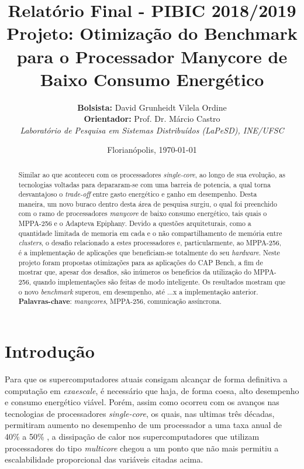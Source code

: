 \documentclass[a4paper,11pt]{article}
\title{\hspace{-0.6cm}\textbf{Relatório Final - PIBIC 2018/2019}\\[0.2cm] \hspace{-0.6cm}\textbf{Projeto:} Otimização do Benchmark \capb para o Processador Manycore de Baixo Consumo Energético \mppa}
\author{\hspace{-0.6cm}\textbf{Bolsista:} David Grunheidt Vilela Ordine\\\hspace{-0.6cm}\textbf{Orientador:} Prof. Dr. Márcio Castro\\ \hspace{-0.6cm}\small{\emph{Laboratório de Pesquisa em Sistemas Distribuídos (LaPeSD), INE/UFSC}}}
\date{\hspace{-0.6cm}\small{Florianópolis, \today}}
\newcommand{\mppa}{MPPA-256\xspace}
\newcommand{\capb}{CAP Bench\xspace}
\newcommand{\epiphany}{Adapteva Epiphany\xspace}
\newcommand{\manycore}{\textit{manycore}\xspace}
\begin{document}
%

\maketitle

\begin{abstract}
Similar ao que aconteceu com os processadores \textit{single-core}, ao longo de sua evolução, as tecnologias voltadas para \hpc depararam-se com uma barreia de potencia, a qual torna desvantajoso o \textit{trade-off} entre gasto energético e ganho em desempenho. Desta maneira, um novo buraco dentro desta área de pesquisa surgiu, o qual foi preenchido com o ramo de processadores \manycore de baixo consumo energético, tais quais o \mppa e o \epiphany. Devido a questões arquiteturais, como a quantidade limitada de memoria em cada \cc e o não compartilhamento de memória entre \textit{clusters}, o desafio relacionado a estes processadores e, particularmente, ao \mppa, é a implementação de aplicações que beneficiam-se totalmente do seu \textit{hardware}. Neste projeto foram propostas otimizações para as aplicações do \capb, a fim de mostrar que, apesar dos desafios, são inúmeros os benefícios da utilização do \mppa, quando implementações são feitas de modo inteligente. Os resultados mostram que o novo \textit{benchmark} superou, em desempenho, até ...x a implementação anterior. \\

\noindent\textbf{Palavras-chave}: \textit{manycores}, MPPA-256, comunicação assíncrona.
\end{abstract}

\tableofcontents

\newpage

\section{Introdução}


Para que os supercomputadores atuais consigam alcançar de forma definitiva a computação em \textit{exaescale}, é necessário que haja, de forma coesa, alto desempenho e consumo energético viável. Porém, assim como ocorreu com os avanços nas tecnologias de processadores \textit{single-core}, os quais, nas ultimas três décadas, permitiram aumento no desempenho de um processador a uma taxa anual de 40\% a 50\%  \cite{Larus:2008:TM:1364782.1364800}, a dissipação de calor nos supercomputadores que utilizam processadores do tipo \textit{multicore} chegou a um ponto que não mais permitiu a escalabilidade proporcional das variáveis citadas acima.
 
\end{document}
